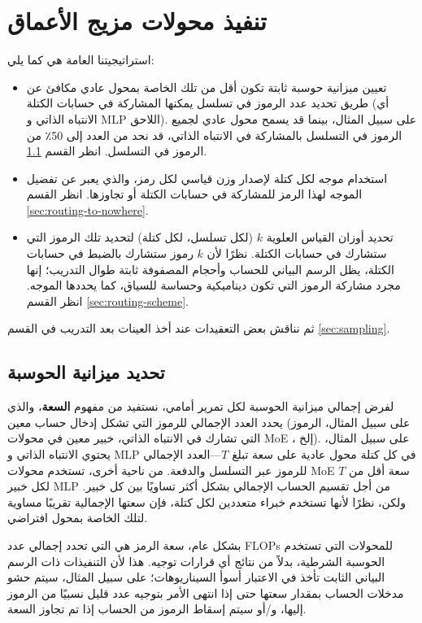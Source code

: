\documentclass[11pt, a4paper, onecolumn, logo, copyright]{googledeepmind}
\begin{document}
\section{تنفيذ محولات مزيج الأعماق}
استراتيجيتنا العامة هي كما يلي:
\begin{itemize}
\item تعيين ميزانية حوسبة ثابتة تكون أقل من تلك الخاصة بمحول عادي مكافئ عن طريق تحديد عدد الرموز في تسلسل يمكنها المشاركة في حسابات الكتلة (أي الانتباه الذاتي و MLP اللاحق). على سبيل المثال، بينما قد يسمح محول عادي لجميع الرموز في التسلسل بالمشاركة في الانتباه الذاتي، قد نحد من العدد إلى 50٪ من الرموز في التسلسل. انظر القسم \ref{sec:define-compute-budget}.
\item استخدام موجه لكل كتلة لإصدار وزن قياسي لكل رمز، والذي يعبر عن تفضيل الموجه لهذا الرمز للمشاركة في حسابات الكتلة أو تجاوزها. انظر القسم \ref{sec:routing-to-nowhere}.
\item تحديد أوزان القياس العلوية $k$ (لكل تسلسل، لكل كتلة) لتحديد تلك الرموز التي ستشارك في حسابات الكتلة. نظرًا لأن $k$ رموز ستشارك بالضبط في حسابات الكتلة، يظل الرسم البياني للحساب وأحجام المصفوفة ثابتة طوال التدريب؛ إنها مجرد مشاركة الرموز التي تكون ديناميكية وحساسة للسياق، كما يحددها الموجه. انظر القسم \ref{sec:routing-scheme}.
\end{itemize}

ثم نناقش بعض التعقيدات عند أخذ العينات بعد التدريب في القسم \ref{sec:sampling}.

\subsection{تحديد ميزانية الحوسبة}
\label{sec:define-compute-budget}

لفرض إجمالي ميزانية الحوسبة لكل تمرير أمامي، نستفيد من مفهوم \textbf{السعة}، والذي يحدد العدد الإجمالي للرموز التي تشكل إدخال حساب معين (على سبيل المثال، الرموز التي تشارك في الانتباه الذاتي، خبير معين في محولات MoE ، إلخ). على سبيل المثال، يحتوي الانتباه الذاتي و MLP في كل كتلة محول عادية على سعة تبلغ $T$---العدد الإجمالي للرموز عبر التسلسل والدفعة. من ناحية أخرى، تستخدم محولات MoE سعة أقل من $T$ لكل خبير MLP من أجل تقسيم الحساب الإجمالي بشكل أكثر تساويًا بين كل خبير. ولكن، نظرًا لأنها تستخدم خبراء متعددين لكل كتلة، فإن سعتها الإجمالية تقريبًا مساوية لتلك الخاصة بمحول افتراضي.

بشكل عام، سعة الرمز هي التي تحدد إجمالي عدد FLOPs للمحولات التي تستخدم الحوسبة الشرطية، بدلاً من نتائج أي قرارات توجيه. هذا لأن التنفيذات ذات الرسم البياني الثابت تأخذ في الاعتبار أسوأ السيناريوهات؛ على سبيل المثال، سيتم حشو مدخلات الحساب بمقدار سعتها حتى إذا انتهى الأمر بتوجيه عدد قليل نسبيًا من الرموز إليها، و/أو سيتم إسقاط الرموز من الحساب إذا تم تجاوز السعة.
\end{document}
